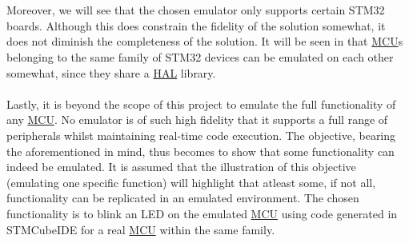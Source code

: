 \\\\
Moreover, we will see that the chosen emulator only supports certain STM32 boards. Although this does constrain the fidelity of the solution somewhat, it does not diminish the completeness of the solution. It will be seen in \textbf{} that \hyperref[listAbr]{MCU}s belonging to the same family of STM32 devices can be emulated on each other somewhat, since they share a \hyperref[listAbr]{HAL} library.
\\\\
Lastly, it is beyond the scope of this project to emulate the full functionality of any \hyperref[listAbr]{MCU}. No emulator is of such high fidelity that it supports a full range of peripherals whilst maintaining real-time code execution. The objective, bearing the aforementioned in mind, thus becomes to show that some functionality can indeed be emulated. It is assumed that the illustration of this objective (emulating one specific function) will highlight that atleast some, if not all, functionality can be replicated in an emulated environment. The chosen functionality is to blink an LED on the emulated \hyperref[listAbr]{MCU} using code generated in STMCubeIDE for a real \hyperref[listAbr]{MCU} within the same family. 

